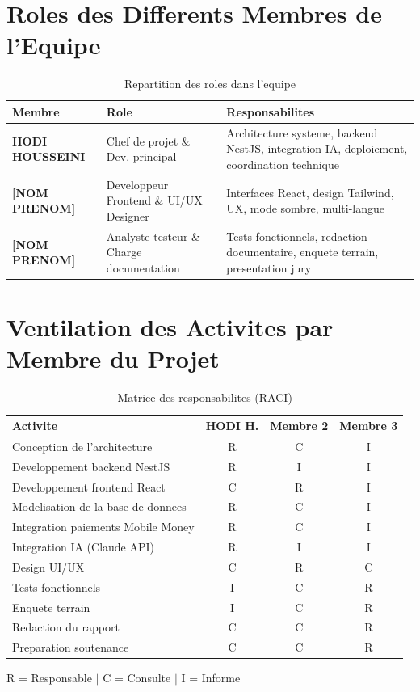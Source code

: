 \documentclass[12pt,a4paper]{report}
\begin{document}
\section{Roles des Differents Membres de l'Equipe}

\begin{table}[ht]
\centering
\caption{Repartition des roles dans l'equipe}
\renewcommand{\arraystretch}{1.5}
\begin{tabularx}{\textwidth}{|l|l|X|}
\hline
\rowcolor{vertpharma!20}
\textbf{Membre} & \textbf{Role} & \textbf{Responsabilites} \\ \hline
\textbf{HODI HOUSSEINI} & Chef de projet \& Dev. principal & Architecture systeme, backend NestJS, integration IA, deploiement, coordination technique \\ \hline
\textbf{[NOM PRENOM]} & Developpeur Frontend \& UI/UX Designer & Interfaces React, design Tailwind, UX, mode sombre, multi-langue \\ \hline
\textbf{[NOM PRENOM]} & Analyste-testeur \& Charge documentation & Tests fonctionnels, redaction documentaire, enquete terrain, presentation jury \\ \hline
\end{tabularx}
\end{table}

\section{Ventilation des Activites par Membre du Projet}

\begin{table}[ht]
\centering
\caption{Matrice des responsabilites (RACI)}
\renewcommand{\arraystretch}{1.4}
{\small
\begin{tabularx}{\textwidth}{|X|c|c|c|}
\hline
\rowcolor{vertpharma!20}
\textbf{Activite} & \textbf{HODI H.} & \textbf{Membre 2} & \textbf{Membre 3} \\ \hline
Conception de l'architecture & R & C & I \\ \hline
Developpement backend NestJS & R & I & I \\ \hline
Developpement frontend React & C & R & I \\ \hline
Modelisation de la base de donnees & R & C & I \\ \hline
Integration paiements Mobile Money & R & C & I \\ \hline
Integration IA (Claude API) & R & I & I \\ \hline
Design UI/UX & C & R & C \\ \hline
Tests fonctionnels & I & C & R \\ \hline
Enquete terrain & I & C & R \\ \hline
Redaction du rapport & C & C & R \\ \hline
Preparation soutenance & C & C & R \\ \hline
\end{tabularx}
}
\vspace{4pt}
\small R = Responsable $\mid$ C = Consulte $\mid$ I = Informe
\end{table}
\end{document}
